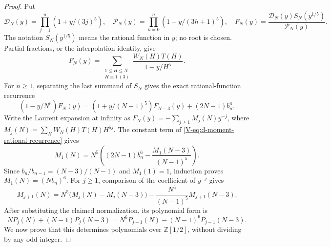 \documentclass[11pt,letterpaper]{article}
\numberwithin{equation}{section}
\begin{document}
\begin{proof}
Put
\[
 \mathcal D_N(y)=\prod_{j=1}^n(1+y/(3j)^5),\quad
 \mathcal P_N(y)=\prod_{h=0}^n(1-y/(3h+1)^5),\quad
 F_N(y)=\frac{\mathcal D_N(y)S_N(y^{1/5})}{\mathcal P_N(y)}.
\]
The notation $S_N(y^{1/5})$ means the rational function in $y$;
no root is chosen. Partial fractions, or the interpolation identity,
give
\[
 F_N(y)=\sum_{\substack{1\le H\le N\\H\equiv1\ (3)}}
 \frac{W_N(H)T(H)}{1-y/H^5}.
\]
For $n\ge1$, separating the last summand of $S_N$ gives the exact
rational-function recurrence
\begin{equation}\label{V-eq:d-moment-rational-recurrence}
 (1-y/N^5)F_N(y)=(1+y/(N-1)^5)F_{N-3}(y)+(2N-1)b_n^6.
\end{equation}
Write the Laurent expansion at infinity as
$F_N(y)=-\sum_{j\ge1}M_j(N)y^{-j}$, where
$M_j(N)=\sum_HW_N(H)T(H)H^{5j}$.
The constant term of \eqref{V-eq:d-moment-rational-recurrence} gives
\[
 M_1(N)=N^5\left((2N-1)b_n^6-
                  \frac{M_1(N-3)}{(N-1)^5}\right).
\]
Since $b_n/b_{n-1}=(N-3)/(N-1)$ and $M_1(1)=1$, induction proves
$M_1(N)=(Nb_n)^6$.
For $j\ge1$, comparison of the coefficient of $y^{-j}$ gives
\[
 M_{j+1}(N)=N^5\bigl(M_j(N)-M_j(N-3)\bigr)
                -\frac{N^5}{(N-1)^5}M_{j+1}(N-3).
\]
After substituting the claimed normalization, its polynomial form is
\begin{equation}\label{V-eq:d-moment-polynomial-recurrence}
 NP_j(N)+(N-1)P_j(N-3)
 =N^6P_{j-1}(N)-(N-1)^6P_{j-1}(N-3).
\end{equation}
We now prove that this determines polynomials over $\mathbb Z[1/2]$,
without dividing by any odd integer.


\end{proof}
\end{document}
